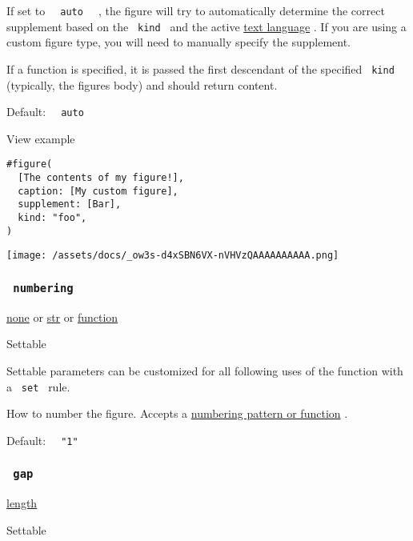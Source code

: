 If set to \texttt{\ }{\texttt{\ auto\ }}\texttt{\ } , the figure will
try to automatically determine the correct supplement based on the
\texttt{\ kind\ } and the active
\href{/docs/reference/text/text/\#parameters-lang}{text language} . If
you are using a custom figure type, you will need to manually specify
the supplement.

If a function is specified, it is passed the first descendant of the
specified \texttt{\ kind\ } (typically, the figure\textquotesingle s
body) and should return content.

Default: \texttt{\ }{\texttt{\ auto\ }}\texttt{\ }


View example

\begin{verbatim}
#figure(
  [The contents of my figure!],
  caption: [My custom figure],
  supplement: [Bar],
  kind: "foo",
)
\end{verbatim}

\texttt{[image: /assets/docs/\_ow3s-d4xSBN6VX-nVHVzQAAAAAAAAAA.png]}

\subsubsection{\texorpdfstring{\texttt{\ numbering\ }}{ numbering }}\label{parameters-numbering}

\href{/docs/reference/foundations/none/}{none} {or}
\href{/docs/reference/foundations/str/}{str} {or}
\href{/docs/reference/foundations/function/}{function}

{{ Settable }}

\label{parameters-numbering-settable-tooltip}
Settable parameters can be customized for all following uses of the
function with a \texttt{\ set\ } rule.

How to number the figure. Accepts a
\href{/docs/reference/model/numbering/}{numbering pattern or function} .

Default: \texttt{\ }{\texttt{\ "1"\ }}\texttt{\ }

\subsubsection{\texorpdfstring{\texttt{\ gap\ }}{ gap }}\label{parameters-gap}

\href{/docs/reference/layout/length/}{length}

{{ Settable }}

